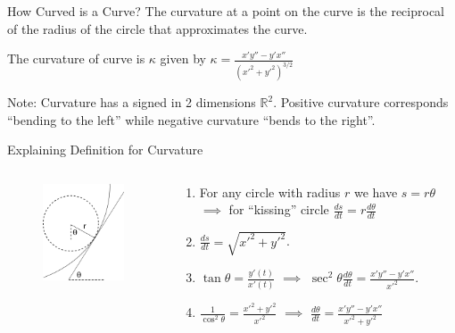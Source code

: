 \documentclass{beamer}
\begin{document}
\begin{frame}{How Curved is a Curve?}
	The curvature at a point on the curve is the reciprocal of the radius of the circle that approximates the curve.
	\begin{definition}[Curvature]
		The curvature of curve is $\kappa$ given by
		$\kappa=\frac{x' y'' - y' x''}{(x'^2+y'^2)^{3/2}}$
	\end{definition}
	Note: Curvature has a signed in 2 dimensions $\mathbb{R}^2$. Positive curvature corresponds ``bending to the left'' while negative curvature ``bends to the right''.
\end{frame}

\begin{frame}{Explaining Definition for Curvature}
	\begin{columns}
		\begin{column}{0.4\textwidth}
			\begin{figure}
				\centering
				\includegraphics[width=50mm, scale=0.4]{illustration.png}
			\end{figure}
		\end{column}
		\begin{column}{0.6\textwidth}
			\begin{enumerate}
				\item For any circle with radius $r$ we have $s=r \theta$ $\implies$ for ``kissing'' circle 
				$\frac{ds}{dt} = r \frac{d\theta}{dt}$
				
				\item $\frac{ds}{dt} = \sqrt{x'^2+y'^2}$.
				
				\item $\tan \theta = \frac{y'(t)}{x'(t)}$ $\implies$ $\sec ^2 \theta \frac{d\theta}{dt} = \frac{x' y'' - y' x''}{x'^2}$.
				
				\item $\frac{1}{\cos^2 \theta} = \frac{x'^2+y'^2}{x'^2}$ $\implies$
				$\frac{d\theta}{dt}=\frac{x' y'' - y' x''}{x'^2+y'^2}$
				

\end{enumerate}
\end{column}
\end{columns}
\end{frame}
\end{document}
